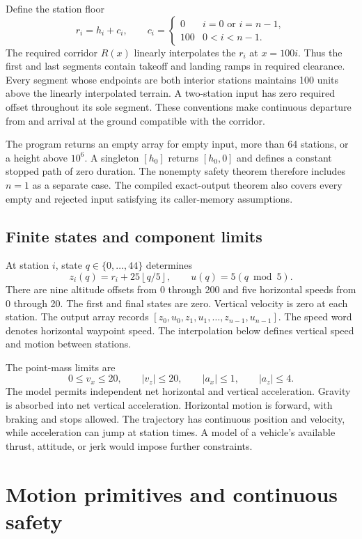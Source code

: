 \documentclass[11pt]{article}
\begin{document}
Define the station floor
\[
 r_i=h_i+c_i,\qquad
 c_i=\begin{cases}0&i=0\text{ or }i=n-1,\\100&0<i<n-1.\end{cases}
\]
The required corridor $R(x)$ linearly interpolates the $r_i$ at $x=100i$.  Thus the first and last segments contain takeoff and landing ramps in required clearance.  Every segment whose endpoints are both interior stations maintains 100 units above the linearly interpolated terrain.  A two-station input has zero required offset throughout its sole segment.  These conventions make continuous departure from and arrival at the ground compatible with the corridor.

The program returns an empty array for empty input, more than 64 stations, or a height above $10^6$.  A singleton $[h_0]$ returns $[h_0,0]$ and defines a constant stopped path of zero duration.  The nonempty safety theorem therefore includes $n=1$ as a separate case.  The compiled exact-output theorem also covers every empty and rejected input satisfying its caller-memory assumptions.

\subsection{Finite states and component limits}

At station $i$, state $q\in\{0,\ldots,44\}$ determines
\[
 z_i(q)=r_i+25\left\lfloor q/5\right\rfloor,
 \qquad u(q)=5(q\bmod5).
\]
There are nine altitude offsets from 0 through 200 and five horizontal speeds from 0 through 20.  The first and final states are zero.  Vertical velocity is zero at each station.  The output array records $[z_0,u_0,z_1,u_1,\ldots,z_{n-1},u_{n-1}]$.  The speed word denotes horizontal waypoint speed.  The interpolation below defines vertical speed and motion between stations.

The point-mass limits are
\[
 0\leq v_x\leq20,\qquad |v_z|\leq20,\qquad
 |a_x|\leq1,\qquad |a_z|\leq4.
\]
The model permits independent net horizontal and vertical acceleration.  Gravity is absorbed into net vertical acceleration.  Horizontal motion is forward, with braking and stops allowed.  The trajectory has continuous position and velocity, while acceleration can jump at station times.  A model of a vehicle's available thrust, attitude, or jerk would impose further constraints.

\section{Motion primitives and continuous safety}
\label{sec:primitives}
\end{document}
